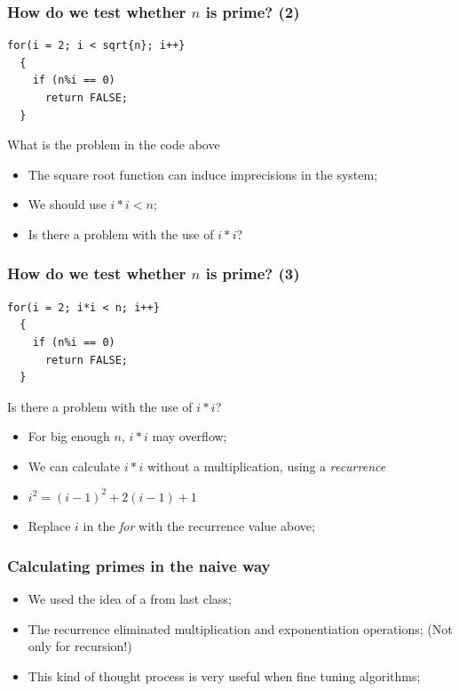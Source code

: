 \documentclass{beamer}
\begin{document}
\begin{frame}
  \frametitle{How do we test whether $n$ is prime? (2)}
\begin{verbatim}
for(i = 2; i < sqrt{n}; i++}
  {
    if (n%i == 0)
      return FALSE;
  }
\end{verbatim}
\vfill
\begin{block}{What is the problem in the code above}
  \begin{itemize}
  \item The square root function can induce imprecisions in the system;
  \item We should use $i*i < n$;
  \item Is there a problem with the use of $i*i$?
  \end{itemize}
\end{block}
\end{frame}

\begin{frame}
  \frametitle{How do we test whether $n$ is prime? (3)}
\begin{verbatim}
for(i = 2; i*i < n; i++}
  {
    if (n%i == 0)
      return FALSE;
  }
\end{verbatim}
\vfill
\begin{block}{Is there a problem with the use of $i*i$?}
  \begin{itemize}
  \item For big enough $n$, $i*i$ may overflow;
  \item We can calculate $i*i$ without a multiplication, using a \emph{recurrence}
  \item $i^2 = (i-1)^2 + 2(i-1) + 1$
  \item Replace $i$ in the \emph{for} with the recurrence value above;
  \end{itemize}
\end{block}
\end{frame}

\begin{frame}
  \frametitle{Calculating primes in the naive way}
  \begin{itemize}
  \item We used the idea of a  from
    last class;
  \item The recurrence eliminated multiplication and exponentiation
    operations; (Not only for recursion!)
  \item This kind of thought process is very useful when fine tuning
    algorithms;
  \end{itemize}
\end{frame}
\end{document}
